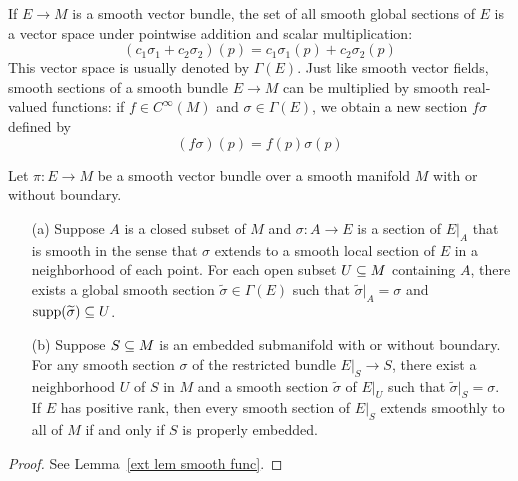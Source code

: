 If $E\to M$ is a smooth vector bundle, the set of all smooth global sections of $E$ is a vector space under pointwise addition and scalar multiplication:
\[(c_1\sigma_1+c_2\sigma_2)(p)=c_1\sigma_1(p)+c_2\sigma_2(p)\]
This vector space is usually denoted by $\Gamma(E)$. Just like smooth vector fields, smooth sections of a smooth bundle $E\to M$ can be multiplied by smooth real-valued functions: if $f\in C^\infty(M)$ and $\sigma\in\Gamma(E)$, we obtain a new section $f\sigma$ defined by
\[(f\sigma)(p)=f(p)\sigma(p)\]
\begin{lemma}\label{ext lem vector bundle}
Let $\pi:E\to M$ be a smooth vector bundle over a smooth manifold $M$ with or without boundary.
\begin{itemize}
\item[(a)] Suppose $A$ is a closed subset of $M$ and $\sigma:A\to E$ is a section of $E|_A$ that is smooth in the sense that $\sigma$ extends to a smooth local section of $E$ in a neighborhood of each point. For each open subset $U\subseteq M$ containing $A$, there exists a global smooth section $\widetilde{\sigma}\in\Gamma(E)$ such that $\widetilde{\sigma}|_A=\sigma$ and $\mathrm{supp}(\widetilde{\sigma})\subseteq U$.
\item[(b)]Suppose $S\subseteq M$ is an embedded submanifold with or without boundary. For any smooth section $\sigma$ of the restricted bundle $E|_S\to S$, there exist a neighborhood $U$ of $S$ in $M$ and a smooth section $\widetilde{\sigma}$ of $E|_U$ such that $\widetilde{\sigma}|_S=\sigma$. If $E$ has positive rank, then every smooth section of $E|_S$ extends smoothly to all of $M$ if and only if $S$ is properly embedded.
\end{itemize}
\end{lemma}
\begin{proof}
See Lemma~\ref{ext lem smooth func}.
\end{proof}
